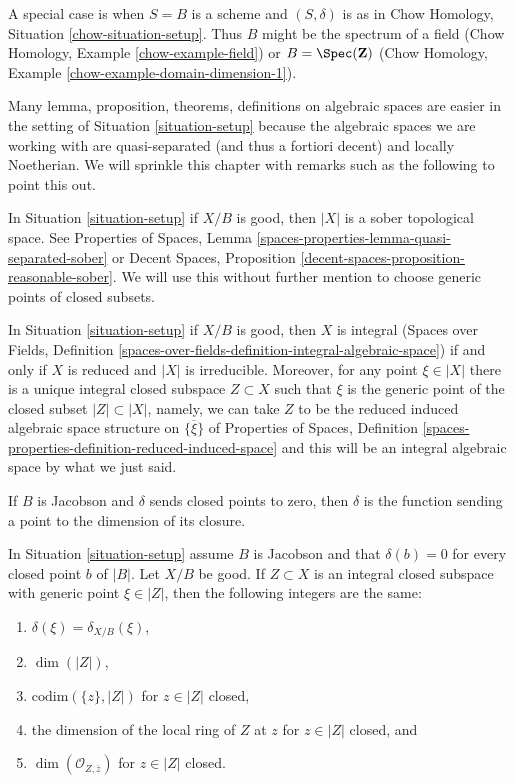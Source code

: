 \noindent
A special case is when $S = B$ is a scheme and $(S, \delta)$ is as in
Chow Homology, Situation \ref{chow-situation-setup}. Thus $B$ might be
the spectrum of a field (Chow Homology, Example \ref{chow-example-field})
or $B = \Spec(\mathbf{Z})$
(Chow Homology, Example \ref{chow-example-domain-dimension-1}).

\medskip\noindent
Many lemma, proposition, theorems, definitions on algebraic spaces
are easier in the setting of Situation \ref{situation-setup} because
the algebraic spaces we are working with are quasi-separated
(and thus a fortiori decent) and locally Noetherian. We will sprinkle
this chapter with remarks such as the following to point this out.

\begin{remark}
\label{remark-sober}
In Situation \ref{situation-setup} if $X/B$ is good, then
$|X|$ is a sober topological space. See
Properties of Spaces, Lemma \ref{spaces-properties-lemma-quasi-separated-sober}
or Decent Spaces, Proposition \ref{decent-spaces-proposition-reasonable-sober}.
We will use this without further mention
to choose generic points of closed subsets.
\end{remark}

\begin{remark}
\label{remark-integral}
In Situation \ref{situation-setup} if $X/B$ is good, then
$X$ is integral (Spaces over Fields, Definition
\ref{spaces-over-fields-definition-integral-algebraic-space})
if and only if $X$ is reduced and $|X|$ is irreducible.
Moreover, for any point $\xi \in |X|$ there is a unique integral closed
subspace $Z \subset X$ such that $\xi$ is the generic point
of the closed subset $|Z| \subset |X|$, namely, we can take
$Z$ to be the reduced induced algebraic space structure on
$\overline{\{\xi\}}$ of Properties of Spaces, Definition
\ref{spaces-properties-definition-reduced-induced-space}
and this will be an integral algebraic space by what we just said.
\end{remark}

\noindent
If $B$ is Jacobson and $\delta$ sends closed points to zero, then $\delta$
is the function sending a point to the dimension of its closure.

\begin{lemma}
\label{lemma-delta-is-dimension}
In Situation \ref{situation-setup} assume $B$ is Jacobson
and that $\delta(b) = 0$ for every closed point $b$ of $|B|$.
Let $X/B$ be good. If $Z \subset X$ is an integral closed subspace
with generic point $\xi \in |Z|$, then the following integers are the same:
\begin{enumerate}
\item $\delta(\xi) = \delta_{X/B}(\xi)$,
\item $\dim(|Z|)$,
\item $\text{codim}(\{z\}, |Z|)$ for $z \in |Z|$ closed,
\item the dimension of the local ring of $Z$ at $z$ for
$z \in |Z|$ closed, and
\item $\dim(\mathcal{O}_{Z, \overline{z}})$ for $z \in |Z|$ closed.
\end{enumerate}
\end{lemma}

